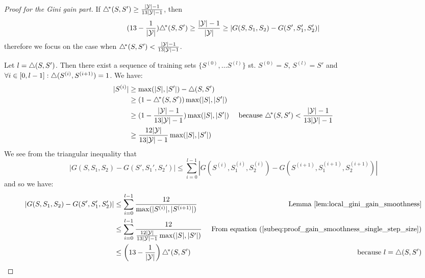 \begin{proof}[Proof for the Gini gain part]
    If $\triangle^{\!*}(S, S') \geq \frac{|\mathcal{Y}|-1}{13|\mathcal{Y}| - 1}$, then 
    \begin{equation*}
        (13-\frac{1}{|\mathcal{Y}|})\triangle^{\!*}(S, S') \geq \frac{|\mathcal{Y}|-1}{|\mathcal{Y}|} \geq |G(S,S_1,S_2) - G(S',S_1',S_2')|
    \end{equation*}
    therefore we focus on the case when $\triangle^{\!*}(S, S') < \frac{|\mathcal{Y}|-1}{13|\mathcal{Y}| - 1}$.

    Let $l = \triangle(S, S')$. Then there exist a sequence of training sets $\{S^{(0)}, \dots S^{(l)}\}$ st. $S^{(0)} = S$, $S^{(l)}=S'$ and $\forall i \in [0, l-1] : \triangle(S^{(i)}, S^{(i+1)}) = 1$. We have:
        \begin{align}
            |S^{(i)}| &\geq \max(|S|, |S'|) - \triangle(S, S')&\notag\\
            &\geq (1-\triangle^{\!*}(S, S'))\max(|S|, |S'|)&\notag\\
            &\geq (1-\frac{|\mathcal{Y}|-1}{13|\mathcal{Y}| - 1})\max(|S|, |S'|)& \text{ because $\triangle^{\!*}(S, S') < \frac{|\mathcal{Y}|-1}{13|\mathcal{Y}| - 1}$}\notag\\
            &\geq \frac{12|\mathcal{Y}|}{13|\mathcal{Y}| - 1}\max(|S|, |S'|)&\label{subeq:proof_gain_smoothness_single_step_size}
        \end{align}
    We see from the triangular inequality that 
    \begin{equation*}
        |G(S,S_1,S_2) - G(S',S_1',S_2')| \leq \sum_{i=0}^{l-1}|G(S^{(i)},S^{(i)}_1,S^{(i)}_2) - G(S^{(i+1)},S^{(i+1)}_1,S^{(i+1)}_2)|        
    \end{equation*}
    and so we have:
    \begin{align*}
        |G(S,S_1,S_2) - G(S',S_1',S_2')| &\leq \sum_{i=0}^{l-1} \frac{12}{\max(|S^{(i)}|, |S^{(i+1)}|)} & \text{ Lemma \ref{lem:local_gini_gain_smoothness}}\\
        &\leq \sum_{i=0}^{l-1} \frac{12}{\frac{12|\mathcal{Y}|}{13|\mathcal{Y}| - 1}\max(|S|, |S'|)} & \text{ From equation (\ref{subeq:proof_gain_smoothness_single_step_size})}\\
        &\leq \left(13-\frac{1}{|\mathcal{Y}|}\right) \triangle^{\!*}(S,S')& \text{ because $l = \triangle(S, S')$}
    \end{align*}
\end{proof}
